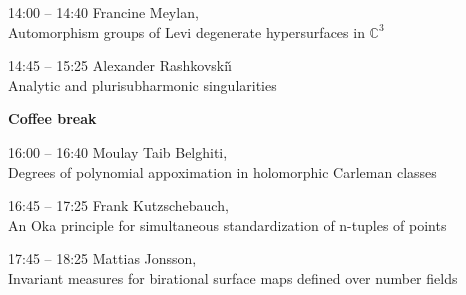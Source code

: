 \documentclass[12pt]{article}
\begin{document}
\begin{itemize}
14:00 -- 14:40  Francine Meylan,\\ 
Automorphism groups of Levi degenerate hypersurfaces in $\mathbb C^3$

14:45 -- 15:25  Alexander Rashkovski{\v\i} \\
Analytic and plurisubharmonic singularities

{\bf Coffee break}

16:00 -- 16:40  Moulay Taib Belghiti, \\
Degrees of polynomial appoximation in
holomorphic Carleman classes

16:45  -- 17:25  Frank Kutzschebauch, \\
An Oka principle for simultaneous standardization of
 n-tuples of points

\vspace{3mm}

17:45 -- 18:25   Mattias Jonsson, \\
Invariant measures for birational surface maps  defined over number fields

\end{itemize}
\end{document}

